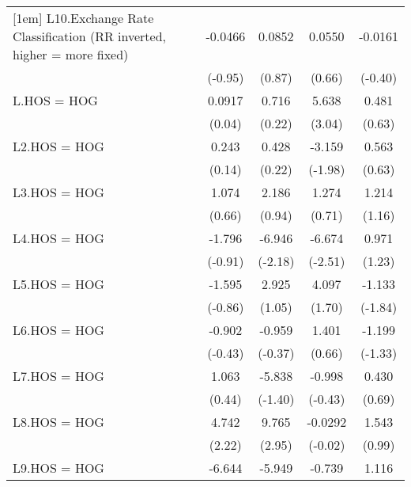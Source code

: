 {\begin{tabular}{l*{4}{c}}
[1em]
L10.Exchange Rate Classification (RR inverted, higher = more fixed)&  -0.0466         &   0.0852         &   0.0550         &  -0.0161         \\
                &  (-0.95)         &   (0.87)         &   (0.66)         &  (-0.40)         \\
[1em]
L.HOS = HOG     &   0.0917         &    0.716         &    5.638\sym{**} &    0.481         \\
                &   (0.04)         &   (0.22)         &   (3.04)         &   (0.63)         \\
[1em]
L2.HOS = HOG    &    0.243         &    0.428         &   -3.159\sym{*}  &    0.563         \\
                &   (0.14)         &   (0.22)         &  (-1.98)         &   (0.63)         \\
[1em]
L3.HOS = HOG    &    1.074         &    2.186         &    1.274         &    1.214         \\
                &   (0.66)         &   (0.94)         &   (0.71)         &   (1.16)         \\
[1em]
L4.HOS = HOG    &   -1.796         &   -6.946\sym{*}  &   -6.674\sym{*}  &    0.971         \\
                &  (-0.91)         &  (-2.18)         &  (-2.51)         &   (1.23)         \\
[1em]
L5.HOS = HOG    &   -1.595         &    2.925         &    4.097         &   -1.133         \\
                &  (-0.86)         &   (1.05)         &   (1.70)         &  (-1.84)         \\
[1em]
L6.HOS = HOG    &   -0.902         &   -0.959         &    1.401         &   -1.199         \\
                &  (-0.43)         &  (-0.37)         &   (0.66)         &  (-1.33)         \\
[1em]
L7.HOS = HOG    &    1.063         &   -5.838         &   -0.998         &    0.430         \\
                &   (0.44)         &  (-1.40)         &  (-0.43)         &   (0.69)         \\
[1em]
L8.HOS = HOG    &    4.742\sym{*}  &    9.765\sym{**} &  -0.0292         &    1.543         \\
                &   (2.22)         &   (2.95)         &  (-0.02)         &   (0.99)         \\
[1em]
L9.HOS = HOG    &   -6.644\sym{***}&   -5.949\sym{***}&   -0.739         &    1.116         \\

\end{tabular}}
